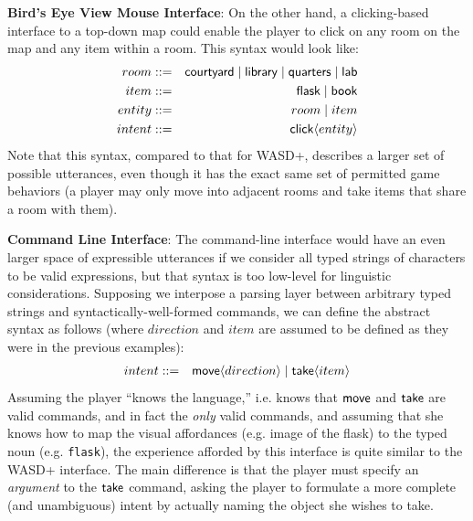   \textbf{Bird's Eye View Mouse Interface}:
  On the other hand, a clicking-based interface to a top-down map could
  enable the player to click on any room on the map and any item within a
  room. This syntax would look like:
  \begin{eqnarray*}
    room   &::=& \mathsf{courtyard} \mid \mathsf{library} \mid \mathsf{quarters}
              \mid \mathsf{lab}\\
    item   &::=& \mathsf{flask} \mid \mathsf{book}\\
    entity &::=& room \mid item\\
    intent &::=& \mathsf{click}\langle entity \rangle
  \end{eqnarray*}
  Note that this syntax, compared to that for WASD+, describes a larger set
  of possible utterances, even though it has the exact same set of
  permitted game behaviors (a player may only move into adjacent rooms and
  take items that share a room with them). 


  \textbf{Command Line Interface}:
  The command-line interface would have an even larger space of expressible
  utterances if we consider all typed strings of characters to be valid
  expressions, but that syntax is too low-level for linguistic
  considerations. Supposing we interpose a parsing layer between arbitrary
  typed strings and syntactically-well-formed commands, we can define the
  abstract syntax as follows (where $direction$ and $item$ are assumed to
  be defined as they were in the previous examples):
%
  \begin{eqnarray*}
    intent &::=& \mathsf{move}\langle direction \rangle \mid \mathsf{take}\langle item \rangle
  \end{eqnarray*}
%
  Assuming the player ``knows the language,'' i.e. knows that $\mathsf{move}$
  and $\mathsf{take}$ are valid commands, and in fact the {\em only} valid
  commands, and assuming that she knows how to map the visual affordances
  (e.g. image of the flask) to the typed noun (e.g. \verb|flask|), the
  experience afforded by this interface is quite similar to the WASD+
  interface. The main difference is that the player must specify an {\em
  argument} to the $\mathsf{take}$ command, asking the player to formulate a
  more complete (and unambiguous) intent by actually naming the object she
  wishes to take.

